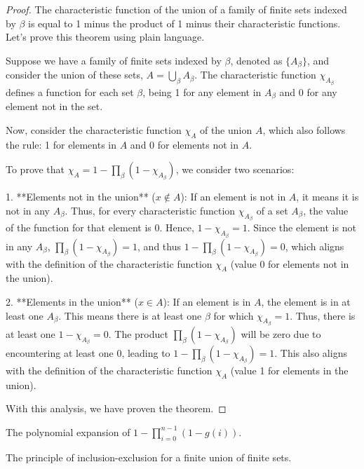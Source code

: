 \begin{proof}
  \leanok
The characteristic function of the union of a family of finite sets indexed by \(\beta\) is equal to 1 minus the product of 1 minus their characteristic functions. Let's prove this theorem using plain language.

Suppose we have a family of finite sets indexed by \(\beta\), denoted as \(\{A_\beta\}\), and consider the union of these sets, \(A = \bigcup_\beta A_\beta\). The characteristic function \(\chi_{A_\beta}\) defines a function for each set \(\beta\), being 1 for any element in \(A_\beta\) and 0 for any element not in the set.

Now, consider the characteristic function \(\chi_A\) of the union \(A\), which also follows the rule: 1 for elements in \(A\) and 0 for elements not in \(A\).

To prove that \(\chi_A = 1 - \prod_\beta (1 - \chi_{A_\beta})\), we consider two scenarios:

1. **Elements not in the union** (\(x \not\in A\)): If an element is not in \(A\), it means it is not in any \(A_\beta\). Thus, for every characteristic function \(\chi_{A_\beta}\) of a set \(A_\beta\), the value of the function for that element is 0. Hence, \(1 - \chi_{A_\beta} = 1\). Since the element is not in any \(A_\beta\), \(\prod_\beta (1 - \chi_{A_\beta}) = 1\), and thus \(1 - \prod_\beta (1 - \chi_{A_\beta}) = 0\), which aligns with the definition of the characteristic function \(\chi_A\) (value 0 for elements not in the union).

2. **Elements in the union** (\(x \in A\)): If an element is in \(A\), the element is in at least one \(A_\beta\). This means there is at least one \(\beta\) for which \(\chi_{A_\beta} = 1\). Thus, there is at least one \(1 - \chi_{A_\beta} = 0\). The product \(\prod_\beta (1 - \chi_{A_\beta})\) will be zero due to encountering at least one 0, leading to \(1 - \prod_\beta (1 - \chi_{A_\beta}) = 1\). This also aligns with the definition of the characteristic function \(\chi_A\) (value 1 for elements in the union).

With this analysis, we have proven the theorem.
\end{proof}

\begin{lemma}\label{mul_expand₀}
  The polynomial expansion of \(1 - \prod_{i=0}^{n-1} (1 - g(i))\).
\end{lemma}

\begin{theorem}\label{Principle_of_Inclusion_Exclusion}
  The principle of inclusion-exclusion for a finite union of finite sets.
\end{theorem}

